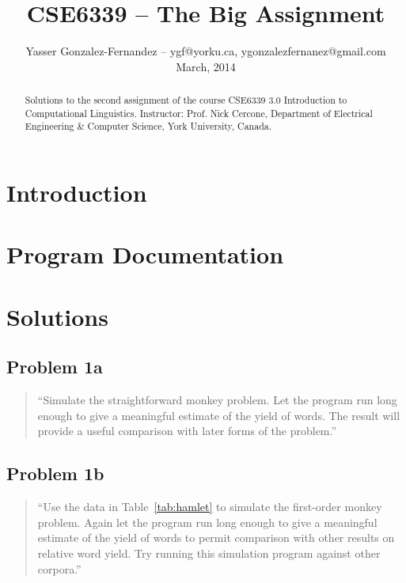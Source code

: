 \documentclass[conference]{IEEEtran}
\begin{document}
\title{CSE6339 -- The Big Assignment\vspace{-14pt}}
\author{Yasser Gonzalez-Fernandez -- ygf@yorku.ca, ygonzalezfernanez@gmail.com\vspace{4pt} \\ March, 2014}

\maketitle


\begin{abstract}
Solutions to the second assignment of the course CSE6339 3.0 Introduction to 
Computational Linguistics. Instructor: Prof. Nick Cercone, Department of 
Electrical Engineering \& Computer Science, York University, Canada.
\end{abstract}

\section{Introduction}


\section{Program Documentation}


\section{Solutions}

\subsection{Problem 1a}

\begin{quote}
``Simulate the straightforward monkey problem. Let the program run long enough to 
give a meaningful estimate of the yield of words. The result will provide a 
useful comparison with later forms of the problem.''
\end{quote}


\subsection{Problem 1b}

\begin{quote}
``Use the data in Table~\ref{tab:hamlet} to simulate the first-order monkey problem. 
Again let the program run long enough to give a meaningful estimate of the yield 
of words to permit comparison with other results on relative word yield. Try running
this simulation program against other corpora.''
\end{quote}
\end{document}
